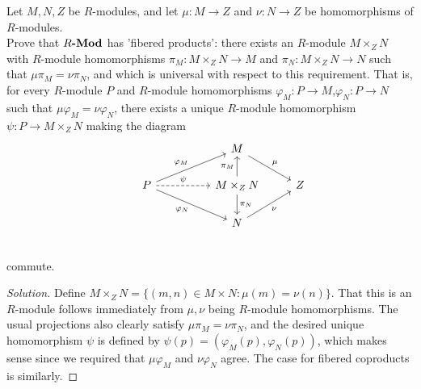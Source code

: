 \documentclass[12pt]{article}
\newenvironment{problem}[2][Problem]{\begin{trivlist}
\item[\hskip \labelsep {\bfseries #1}\hskip \labelsep {\bfseries #2.}]}{\end{trivlist}}
\newcommand{\catname}[1]{\normalfont\textbf{#1}}
\newcommand{\Mod}[1]{#1\catname{-Mod}}
\newenvironment{solution}
  {\renewcommand\qedsymbol{$\blacksquare$}\begin{proof}[Solution]}
{\end{proof}}
\theoremstyle{remark}
\begin{document}
\begin{problem}{6.10}
  Let $M,N,Z$ be $R$-modules, and let $\mu:M\to Z$ and $\nu:N\to Z$
  be homomorphisms of $R$-modules.\\
  \indent Prove that $\Mod{R}$ has 'fibered products':
  there exists an $R$-module $M\times_ZN$ with $R$-module homomorphisms
  $\pi_M:M\times_ZN\to M$ and $\pi_N:M\times_ZN\to N$ such that
  $\mu\pi_M=\nu\pi_N$, and which is universal with respect to this requirement.
  That is, for every $R$-module $P$ and $R$-module homomorphisms
  $\varphi_M:P\to M$,$\varphi_N:P\to N$ such that
  $\mu\varphi_M=\nu\varphi_N$, there exists a unique
  $R$-module homomorphism $\psi:P\to M\times_ZN$ making the diagram
  \[
    \begin{tikzcd}
      &&& M\ar{dr}{\mu} & \\
      & P \ar[dashed]{rr}{\psi} 
      \ar{urr}{\varphi_M} 
      \ar{drr}[swap]{\varphi_N}
      && M\times_ZN \ar{u}{\pi_M} \ar{d}{\pi_N} 
      & Z \\
      &&& N\ar{ur}[swap]{\nu} & \\
    \end{tikzcd}
  \]
  commute.
\end{problem}
\begin{solution}
  Define $M\times_ZN=\{(m,n)\in M\times N:\mu(m)=\nu(n)\}$.
  That this is an $R$-module follows immediately from
  $\mu,\nu$ being $R$-module homomorphisms.
  The usual projections also clearly satisfy $\mu\pi_M=\nu\pi_N$, and
  the desired unique homomorphism $\psi$ is defined by
  $\psi(p)=(\varphi_M(p),\varphi_N(p))$, which makes sense since
  we required that $\mu\varphi_M$ and $\nu\varphi_N$ agree.
  The case for fibered coproducts is similarly.
\end{solution}
\end{document}
